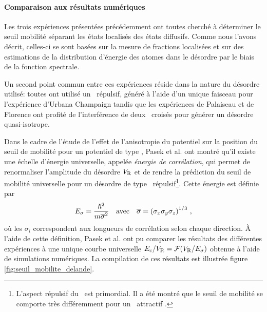 \paragraph*{Comparaison aux résultats numériques}
Les trois expériences présentées précédemment \citep{jendrzejewski2012three,kondov2011three,semeghini2015measurement} ont toutes cherché à déterminer le seuil mobilité séparant les états localisés des états diffusifs. Comme nous l'avons décrit, celles-ci se sont basées sur la mesure de fractions localisées et sur des estimations de la distribution d'énergie des atomes dans le désordre par le biais de la fonction spectrale.

Un second point commun entre ces expériences réside dans la nature du désordre utilisé: toutes ont utilisé un \speckle\ répulsif, généré à l'aide d'un unique faisceau pour l'expérience d'Urbana Champaign tandis que les expériences de Palaiseau et de Florence ont profité de l'interférence de deux \speckles\ croisés pour générer un désordre quasi-isotrope. 

Dans le cadre de l'étude de l'effet de l'anisotropie du potentiel sur la position du seuil de mobilité pour un potentiel de type \speckle , Pasek et al. \citep{pasek2017anderson} ont montré qu'il existe une échelle d'énergie universelle, appelée \emph{énergie de corrélation}, qui permet de renormaliser l'amplitude du désordre $V_{\mathrm{R}}$ et de rendre la prédiction du seuil de mobilité universelle pour un désordre de type \speckle\ répulsif\footnote{L'aspect répulsif du \speckle\ est primordial. Il a été montré que le seuil de mobilité se comporte très différemment pour un \speckle\ attractif \citep{delande2014mobility}.}. Cette énergie est définie par
\begin{equation}
E_{\sigma}=\frac{\hslash^2}{m\overline{\sigma}^2} \quad \text{avec} \quad \overline{\sigma}={(\sigma_x \sigma_y \sigma_z)}^{1/3} \text{ ,}
\end{equation}
où les $\sigma_i$ correspondent aux longueurs de corrélation selon chaque direction. À l'aide de cette définition, Pasek et al. ont pu comparer les résultats des différentes expériences à une unique courbe universelle $E_{\mathrm{c}}/V_{\mathrm{R}}=\mathcal{F}(V_{\mathrm{R}}/E_{\sigma})$ obtenue à l'aide de simulations numériques. La compilation de ces résultats est illustrée figure \ref{fig:seuil_mobilite_delande}.



